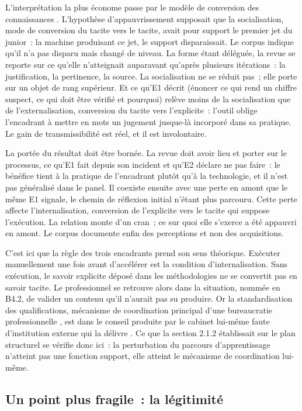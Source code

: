 L'interprétation la plus économe passe par le modèle de conversion des connaissances
\cite{nonaka1997}. L'hypothèse d'appauvrissement supposait que la socialisation, mode de
conversion du tacite vers le tacite, avait pour support le premier jet du junior~: la machine
produisant ce jet, le support disparaissait. Le corpus indique qu'il n'a pas disparu mais
changé de niveau. La forme étant déléguée, la revue se reporte sur ce qu'elle n'atteignait
auparavant qu'après plusieurs itérations~: la justification, la pertinence, la source. La
socialisation ne se réduit pas~; elle porte sur un objet de rang supérieur. Et ce qu'E1 décrit
(énoncer ce qui rend un chiffre suspect, ce qui doit être vérifié et pourquoi) relève
moins de la socialisation que de l'externalisation, conversion du tacite vers l'explicite~:
l'outil oblige l'encadrant à mettre en mots un jugement jusque-là incorporé dans sa pratique.
Le gain de transmissibilité est réel, et il est involontaire.

La portée du résultat doit être bornée. La revue doit avoir lieu et porter sur le processus,
ce qu'E1 fait depuis son incident et qu'E2 déclare ne pas faire~: le bénéfice tient à la
pratique de l'encadrant plutôt qu'à la technologie, et il n'est pas généralisé dans le panel.
Il coexiste ensuite avec une perte en amont que le même E1 signale, le chemin de réflexion
initial n'étant plus parcouru. Cette perte affecte l'internalisation, conversion de
l'explicite vers le tacite qui suppose l'exécution. La relation monte d'un cran~; ce sur quoi elle
s'exerce a été appauvri en amont. Le corpus documente enfin des perceptions et non des
acquisitions.

C'est ici que la règle des trois encadrants prend son sens théorique. Exécuter manuellement
une fois avant d'accélérer est la condition d'internalisation. Sans exécution, le savoir
explicite déposé dans les méthodologies ne se convertit pas en savoir tacite. Le
professionnel se retrouve alors dans la situation, nommée en B4.2, de valider un contenu
qu'il n'aurait pas su produire. Or la standardisation des qualifications, mécanisme de
coordination principal d'une bureaucratie professionnelle \cite{mintzberg1982}, est dans le
conseil produite par le cabinet lui-même faute d'institution externe qui la délivre
\cite{nordenflycht2010}. Ce que la section 2.1.2 établissait sur le plan structurel se
vérifie donc ici~: la perturbation du parcours d'apprentissage n'atteint pas une fonction
support, elle atteint le mécanisme de coordination lui-même.

\subsection{Un point plus fragile~: la légitimité}

